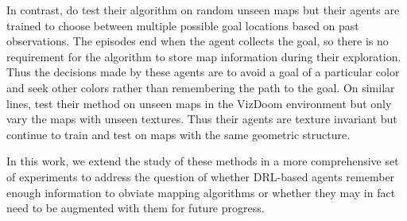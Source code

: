 In contrast, \cite{OhChSiICML2016} do test their algorithm on random unseen maps but their agents are trained to choose between multiple possible goal locations based on past observations.
The episodes end when the agent collects the goal, so there is no requirement for the algorithm to store map information during their exploration.
Thus the decisions made by these agents are to avoid a goal of a particular color and seek other colors rather than remembering the path to the goal.
On similar lines, \cite{ChLaSaNIPS2016} test their method on unseen maps in the VizDoom environment but only vary the maps with unseen textures. Thus their agents are texture invariant but continue to train and test on maps with the same geometric structure.
%

In this work, we extend the study of these methods in a more comprehensive set of experiments to address the question of whether DRL-based agents remember enough information to obviate mapping algorithms or whether they may in fact need to be augmented with them for future progress.
 
